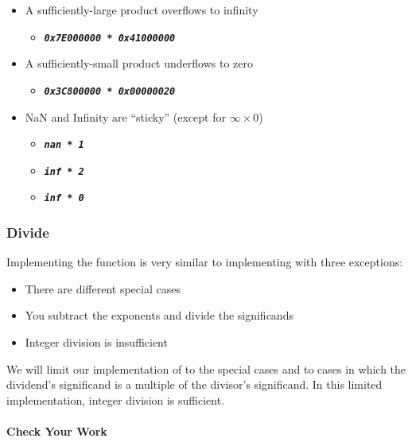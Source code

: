 \begin{itemize}
        \item A sufficiently-large product overflows to infinity
        \begin{itemize}
            \item[] \texttt{\textbf{\textit{0x7E000000 * 0x41000000}}}
        \end{itemize}
        \item A sufficiently-small product underflows to zero
        \begin{itemize}
            \item[] \texttt{\textbf{\textit{0x3C800000 * 0x00000020}}}
        \end{itemize}
        \item NaN and Infinity are ``sticky'' (except for $\infty \times 0$)
        \begin{itemize}
            \item[] \texttt{\textbf{\textit{nan * 1}}}
            \item[] \texttt{\textbf{\textit{inf * 2}}}
            \item[] \texttt{\textbf{\textit{inf * 0}}}
        \end{itemize}
    \end{itemize}

    \subsubsection{Divide}

    Implementing the  function is very similar to implementing  with three exceptions:

    \begin{itemize}
        \item There are different special cases
        \item You subtract the exponents and divide the significands
        \item Integer division is insufficient
    \end{itemize}

    We will limit our implementation of  to the special cases and to cases in which the dividend's significand is a multiple of the divisor's significand.
    In this limited implementation, integer division is sufficient.

    \paragraph*{Check Your Work}

